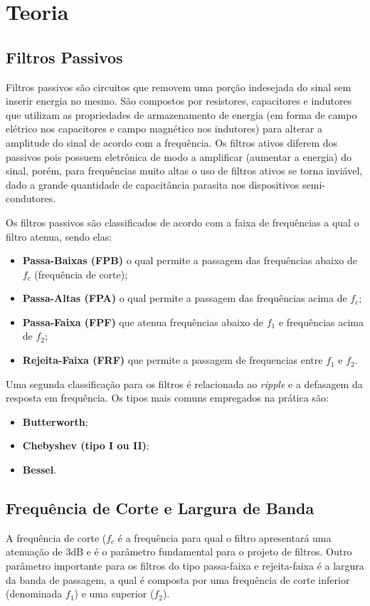 
\newpage

\section{Teoria}
\subsection{Filtros Passivos}
Filtros passivos são circuitos que removem uma porção indesejada do sinal sem inserir energia no mesmo. São compostos por resistores, capacitores e indutores que utilizam as propriedades de armazenamento de energia (em forma de campo elétrico nos capacitores e campo magnético nos indutores) para alterar a amplitude do sinal de acordo com a frequência. Os filtros ativos diferem dos passivos pois possuem eletrônica de modo a amplificar (aumentar a energia) do sinal, porém, para frequências muito altas o uso de filtros ativos se torna inviável, dado a grande quantidade de capacitância parasita nos dispositivos semi-condutores.

Os filtros passivos são classificados de acordo com a faixa de frequências a qual o filtro atenua, sendo elas:
\begin{itemize}
    \item \textbf{Passa-Baixas (FPB)} o qual permite a passagem das frequências abaixo de $f_c$ (frequência de corte);
    
    \item \textbf{Passa-Altas (FPA)} o qual permite a passagem das frequências acima de $f_c$;
    
    \item \textbf{Passa-Faixa (FPF)} que atenua frequências abaixo de $f_1$ e frequências acima de $f_2$;
    
    \item \textbf{Rejeita-Faixa (FRF)} que permite a passagem de frequencias entre $f_1$ e $f_2$.
    
\end{itemize}

Uma segunda classificação para os filtros é relacionada ao \textit{ripple} e a defasagem da resposta em frequência. Os tipos mais comuns empregados na prática são:

\begin{itemize}
    \item \textbf{Butterworth};
    \item \textbf{Chebyshev (tipo I ou II)};
    \item \textbf{Bessel}.
\end{itemize}

\subsection{Frequência de Corte e Largura de Banda}
A frequência de corte ($f_c$ é a frequência para qual o filtro apresentará uma atenuação de 3dB e é o parâmetro fundamental para o projeto de filtros.
Outro parâmetro importante para os filtros do tipo passa-faixa e rejeita-faixa é a largura da banda de passagem, a qual é composta por uma frequência de corte inferior (denominada $f_1$) e uma superior ($f_2$).